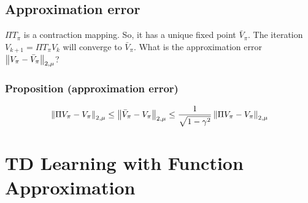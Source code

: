 \documentclass[11pt]{book}
\begin{document}
\subsection{Approximation error}
$\Pi T_\pi$ is a contraction mapping. So, it has a unique fixed point $\bar{V}_\pi$. The iteration $V_{k+1} = \Pi T_\pi V_k$ will converge to $\bar{V}_\pi$. What is the approximation error $\left\lVert V_\pi - \bar{V}_\pi \right\rVert_{2,\mu}$?
\subsubsection{Proposition (approximation error)}
\[
  \left\lVert \Pi V_\pi - V_\pi \right\rVert_{2,\mu} \leq \left\lVert \bar{V}_\pi - V_\pi \right\rVert_{2,\mu} \leq \frac{1}{\sqrt{1-\gamma^2}} \left\lVert \Pi V_\pi - V_\pi \right\rVert_{2,\mu}
\]
\section{TD Learning with Function Approximation}
\end{document}
